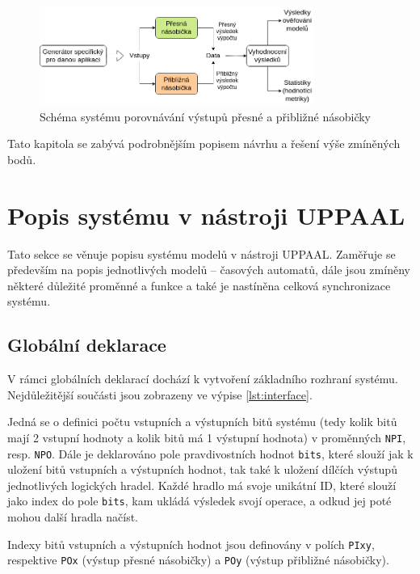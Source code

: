 \begin{figure}[H]
    \centering
    \includegraphics[width=0.8\textwidth]{obrazky-figures/acc_approx_diagram.png}
    \caption{Schéma systému porovnávání výstupů přesné a přibližné násobičky}
    \label{fig:acc_approx_diagram}
\end{figure}

Tato kapitola se zabývá podrobnějším popisem návrhu a řešení výše zmíněných bodů.

\section{Popis systému v nástroji UPPAAL}
Tato sekce se věnuje popisu systému modelů v nástroji UPPAAL. Zaměřuje se především na popis jednotlivých modelů -- časových automatů, dále jsou zmíněny některé důležité proměnné a funkce a také je nastíněna celková synchronizace systému.

\subsection{Globální deklarace}
V rámci globálních deklarací dochází k vytvoření základního rozhraní systému. Nejdůležitější součásti jsou zobrazeny ve výpise \ref{lst:interface}. 

Jedná se o definici počtu vstupních a výstupních bitů systému (tedy kolik bitů mají 2 vstupní hodnoty a kolik bitů má 1 výstupní hodnota) v proměnných \texttt{NPI}, resp. \texttt{NPO}. Dále je deklarováno pole pravdivostních hodnot \texttt{bits}, které slouží jak k uložení bitů vstupních a výstupních hodnot, tak také k uložení dílčích výstupů jednotlivých logických hradel. Každé hradlo má svoje unikátní ID, které slouží jako index do pole \texttt{bits}, kam ukládá výsledek svojí operace, a odkud jej poté mohou další hradla načíst.

Indexy bitů vstupních a výstupních hodnot jsou definovány v polích \texttt{PIxy}, respektive \texttt{POx} (výstup přesné násobičky) a \texttt{POy} (výstup přibližné násobičky).

